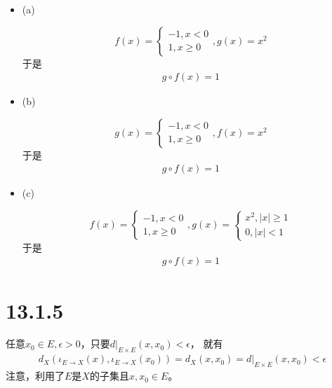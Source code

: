 \documentclass{article}
\begin{document}
\begin{itemize}
  \item (a)

        \begin{equation*}
          f(x) =
          \begin{cases}
            -1, x < 0 \\
            1, x \geq 0
          \end{cases}
          ,g(x) = x^2
        \end{equation*}
        于是
        \begin{align*}
          g \circ f(x) = 1
        \end{align*}

  \item (b)

        \begin{equation*}
          g(x) =
          \begin{cases}
            -1, x < 0 \\
            1, x \geq 0
          \end{cases}
          ,f(x) = x^2
        \end{equation*}
        于是
        \begin{align*}
          g \circ f(x) = 1
        \end{align*}

  \item (c)

        \begin{equation*}
          f(x) =
          \begin{cases}
            -1, x < 0 \\
            1, x \geq 0
          \end{cases}
          ,g(x) =
          \begin{cases}
            x^2, |x| \geq 1 \\
            0, |x| < 1
          \end{cases}
        \end{equation*}
        于是
        \begin{align*}
          g \circ f(x) = 1
        \end{align*}

\end{itemize}

\section*{13.1.5}
任意$x_0 \in E, \epsilon > 0$，只要$d|_{E \times E}(x, x_0) < \epsilon$， 就有
\begin{align*}
  d_X(\iota _{E \to X}(x), \iota _{E \to X}(x_0)) = d_X(x, x_0) = d|_{E \times E}(x, x_0) < \epsilon
\end{align*}
注意，利用了$E$是$X$的子集且$x, x_0 \in E$。
\end{document}
